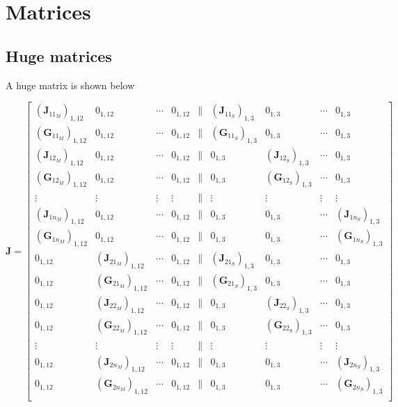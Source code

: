 \section{Matrices}

\subsection{Huge matrices}

A huge matrix is shown below

\begin{equation}
    \mathbf{J} = \begin{bmatrix}
        (\mathbf{J}_{11_M})_{1,12} & 0_{1,12} & \cdots & 0_{1,12} & \parallel & (\mathbf{J}_{11_S})_{1,3} & 0_{1,3} & \cdots & 0_{1,3} \\
        (\mathbf{G}_{11_M})_{1,12} & 0_{1,12} & \cdots & 0_{1,12} & \parallel & (\mathbf{G}_{11_S})_{1,3} & 0_{1,3} & \cdots & 0_{1,3} \\
        (\mathbf{J}_{12_M})_{1,12} & 0_{1,12} & \cdots & 0_{1,12} & \parallel & 0_{1,3} & (\mathbf{J}_{12_S})_{1,3} & \cdots & 0_{1,3} \\
        (\mathbf{G}_{12_M})_{1,12} & 0_{1,12} & \cdots & 0_{1,12} & \parallel & 0_{1,3} & (\mathbf{G}_{12_S})_{1,3} & \cdots & 0_{1,3} \\
        \vdots & \vdots & \vdots & \vdots & \parallel & \vdots & \vdots & \vdots & \vdots \\
        (\mathbf{J}_{1n_M})_{1,12} & 0_{1,12} & \cdots & 0_{1,12} & \parallel & 0_{1,3} & 0_{1,3} & \cdots & (\mathbf{J}_{1n_S})_{1,3} \\
        (\mathbf{G}_{1n_M})_{1,12} & 0_{1,12} & \cdots & 0_{1,12} & \parallel & 0_{1,3} & 0_{1,3} & \cdots & (\mathbf{G}_{1n_S})_{1,3} \\
        
        0_{1,12} & (\mathbf{J}_{21_M})_{1,12} & \cdots & 0_{1,12} & \parallel & (\mathbf{J}_{21_S})_{1,3} & 0_{1,3} & \cdots & 0_{1,3} \\
        0_{1,12} & (\mathbf{G}_{21_M})_{1,12} & \cdots & 0_{1,12} & \parallel & (\mathbf{G}_{21_S})_{1,3} & 0_{1,3} & \cdots & 0_{1,3} \\
        0_{1,12} & (\mathbf{J}_{22_M})_{1,12} & \cdots & 0_{1,12} & \parallel & 0_{1,3} & (\mathbf{J}_{22_S})_{1,3} & \cdots & 0_{1,3} \\
        0_{1,12} & (\mathbf{G}_{22_M})_{1,12} & \cdots & 0_{1,12} & \parallel & 0_{1,3} & (\mathbf{G}_{22_S})_{1,3} & \cdots & 0_{1,3} \\
        \vdots & \vdots & \vdots & \vdots & \parallel & \vdots & \vdots & \vdots & \vdots \\
        0_{1,12} & (\mathbf{J}_{2n_M})_{1,12} & \cdots & 0_{1,12} & \parallel & 0_{1,3} & 0_{1,3} & \cdots & (\mathbf{J}_{2n_S})_{1,3} \\
        0_{1,12} & (\mathbf{G}_{2n_M})_{1,12} & \cdots & 0_{1,12} & \parallel & 0_{1,3} & 0_{1,3} & \cdots & (\mathbf{G}_{2n_S})_{1,3} \\


\end{bmatrix}
\end{equation}
